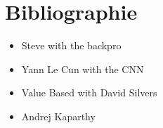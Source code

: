 \documentclass[12pt,a4paper]{extarticle}
\begin{document}
\section*{Bibliographie}
\begin{itemize}

\item Steve with the backpro
\item Yann Le Cun with the CNN
\item Value Based with David Silvers
\item Andrej Kaparthy

\end{itemize}
\end{document}
